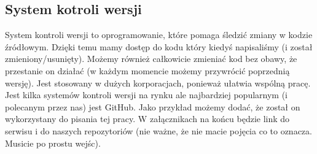 \subsection{System kotroli wersji}
System kontroli wersji to oprogramowanie, które pomaga śledzić zmiany w kodzie źródłowym.
Dzięki temu mamy dostęp do kodu który kiedyś napisaliśmy (i został zmieniony/usunięty). Możemy również całkowicie zmieniać kod bez obawy, że przestanie on działać (w każdym momencie możemy przywrócić poprzednią wersję). Jest stosowany w dużych korporacjach, ponieważ ułatwia wspólną pracę. Jest kilka systemów kontroli wersji na rynku ale najbardziej popularnym (i polecanym przez nas) jest GitHub. Jako przykład możemy dodać, że został on wykorzystany do pisania tej pracy. W załącznikach na końcu będzie link do serwisu i do naszych repozytoriów (nie ważne, że nie macie pojęcia co to oznacza. Musicie po prostu wejśc).
\subsection{}

\nocite{klucz01}

\newpage
 




